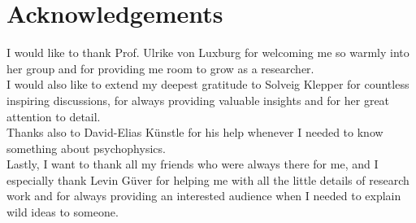\documentclass[twoside,12pt,a4paper]{report}
\begin{document}
\newpage
\section*{Acknowledgements}
I would like to thank Prof. Ulrike von Luxburg for welcoming me so warmly into her group and for providing me room to grow as a researcher. \\
I would also like to extend my deepest gratitude to Solveig Klepper for countless inspiring discussions, 
for always providing valuable insights and for her great attention to detail. \\
Thanks also to David-Elias Künstle for his help whenever I needed to know something about psychophysics.\\
Lastly, I want to thank all my friends who were always there for me, and I especially thank Levin Güver for helping me with all the little details 
of research work and for always providing an interested audience when I needed to explain wild ideas to someone.

\cleardoublepage


\renewcommand{\baselinestretch}{1.3}
\small\normalsize

\tableofcontents

\renewcommand{\baselinestretch}{1}
\small\normalsize

\cleardoublepage



\setcounter{page}{1}


\cleardoublepage



\cleardoublepage


\cleardoublepage


\cleardoublepage


\cleardoublepage


\cleardoublepage
\end{document}
